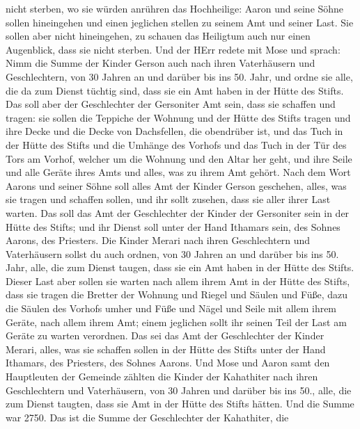 nicht sterben, wo sie würden anrühren das Hochheilige: Aaron und seine
Söhne sollen hineingehen und einen jeglichen stellen zu seinem Amt und
seiner Last.  Sie sollen aber nicht hineingehen, zu schauen
das Heiligtum auch nur einen Augenblick, dass sie nicht sterben.
 Und der HErr redete mit Mose und sprach: 
Nimm die Summe der Kinder Gerson auch nach ihren Vaterhäusern und
Geschlechtern,  von 30 Jahren an und darüber bis ins 50.
Jahr, und ordne sie alle, die da zum Dienst tüchtig sind, dass sie ein
Amt haben in der Hütte des Stifts.  Das soll aber der
Geschlechter der Gersoniter Amt sein, dass sie schaffen und tragen:
 sie sollen die Teppiche der Wohnung und der Hütte des
Stifts tragen und ihre Decke und die Decke von Dachsfellen, die
obendrüber ist, und das Tuch in der Hütte des Stifts  und
die Umhänge des Vorhofs und das Tuch in der Tür des Tors am Vorhof,
welcher um die Wohnung und den Altar her geht, und ihre Seile und alle
Geräte ihres Amts und alles, was zu ihrem Amt gehört.  Nach
dem Wort Aarons und seiner Söhne soll alles Amt der Kinder Gerson
geschehen, alles, was sie tragen und schaffen sollen, und ihr sollt
zusehen, dass sie aller ihrer Last warten.  Das soll das
Amt der Geschlechter der Kinder der Gersoniter sein in der Hütte des
Stifts; und ihr Dienst soll unter der Hand Ithamars sein, des Sohnes
Aarons, des Priesters.  Die Kinder Merari nach ihren
Geschlechtern und Vaterhäusern sollst du auch ordnen,  von
30 Jahren an und darüber bis ins 50. Jahr, alle, die zum Dienst taugen,
dass sie ein Amt haben in der Hütte des Stifts.  Dieser
Last aber sollen sie warten nach allem ihrem Amt in der Hütte des
Stifts, dass sie tragen die Bretter der Wohnung und Riegel und Säulen
und Füße,  dazu die Säulen des Vorhofs umher und Füße und
Nägel und Seile mit allem ihrem Geräte, nach allem ihrem Amt; einem
jeglichen sollt ihr seinen Teil der Last am Geräte zu warten verordnen.
 Das sei das Amt der Geschlechter der Kinder Merari, alles,
was sie schaffen sollen in der Hütte des Stifts unter der Hand Ithamars,
des Priesters, des Sohnes Aarons.  Und Mose und Aaron samt
den Hauptleuten der Gemeinde zählten die Kinder der Kahathiter nach
ihren Geschlechtern und Vaterhäusern,  von 30 Jahren und
darüber bis ins 50., alle, die zum Dienst taugten, dass sie Amt in der
Hütte des Stifts hätten.  Und die Summe war 2750.
 Das ist die Summe der Geschlechter der Kahathiter, die

